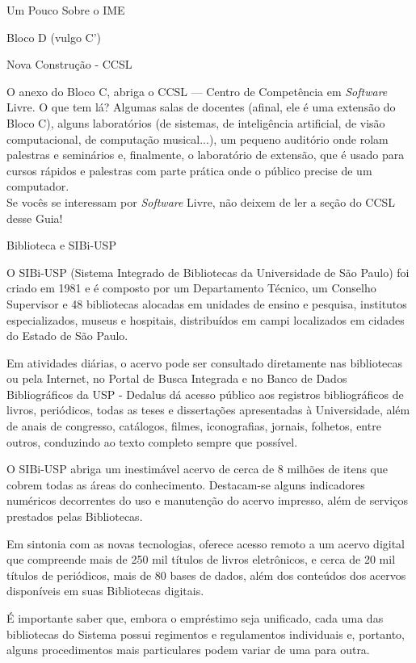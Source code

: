 \begin{secao}{Um Pouco Sobre o IME}
\begin{subsecao}{Bloco D (vulgo C')}
\end{subsecao}

\begin{subsecao}{Nova Construção - CCSL}

O anexo do Bloco C, abriga o CCSL --- Centro de Competência em \textit{Software}
Livre. O que tem lá? Algumas salas de docentes (afinal, ele é uma extensão do
Bloco C), alguns laboratórios (de sistemas, de inteligência artificial,
de visão computacional, de computação musical...), um pequeno auditório
onde rolam palestras e seminários e, finalmente, o laboratório de extensão,
que é usado para cursos rápidos e palestras com parte prática onde o público
precise de um computador.\\
Se vocês se interessam por \textit{Software} Livre, não deixem de ler a seção
do CCSL desse Guia!

\end{subsecao}

\begin{subsecao}{Biblioteca e SIBi-USP}

O SIBi-USP (Sistema Integrado de Bibliotecas da Universidade de São Paulo) foi
criado em 1981 e é composto por um Departamento Técnico, um Conselho Supervisor
e 48 bibliotecas alocadas em unidades de ensino e pesquisa, institutos
especializados, museus e hospitais, distribuídos em campi localizados em
cidades do Estado de São Paulo.

Em atividades diárias, o acervo pode ser consultado diretamente nas bibliotecas
ou pela Internet, no Portal de Busca Integrada e no Banco de Dados
Bibliográficos da USP - Dedalus dá acesso público aos registros bibliográficos
de livros, periódicos, todas as teses e dissertações apresentadas à
Universidade, além de anais de congresso, catálogos, filmes, iconografias,
jornais, folhetos, entre outros, conduzindo ao texto completo sempre que
possível.

O SIBi-USP abriga um inestimável acervo de cerca de 8 milhões de itens que
cobrem todas as áreas do conhecimento. Destacam-se alguns indicadores numéricos
decorrentes do uso e manutenção do acervo impresso, além de serviços prestados
pelas Bibliotecas.

Em sintonia com as novas tecnologias, oferece acesso remoto a um acervo digital
que compreende mais de 250 mil títulos de livros eletrônicos, e cerca de 20 mil
títulos de periódicos, mais de 80 bases de dados, além dos conteúdos dos acervos
disponíveis em suas Bibliotecas digitais.

É importante saber que, embora o empréstimo seja unificado, cada uma das
bibliotecas do Sistema possui regimentos e regulamentos individuais e, portanto,
alguns procedimentos mais particulares podem variar de uma para outra.


\end{subsecao}
\end{secao}
